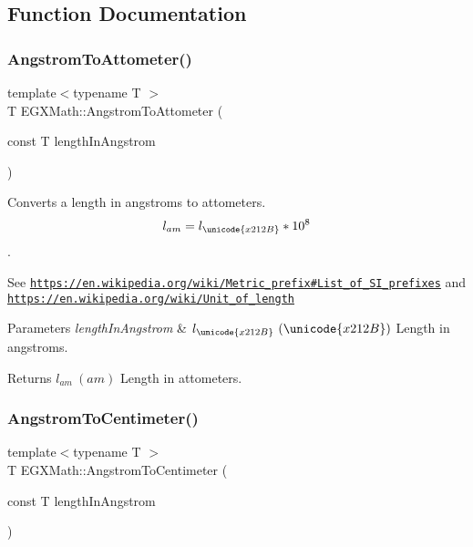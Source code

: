 \subsection{Function Documentation}
\mbox{\label{group___e_g_x_math-_conversions-_length_conversions-_non-_s_i-_angstrom-_s_i_ga9bb7edf645cb82492a8792132dbb74e6}} 
\subsubsection{\texorpdfstring{Angstrom\+To\+Attometer()}{AngstromToAttometer()}}
{\footnotesize\ttfamily template$<$typename T $>$ \\
T E\+G\+X\+Math\+::\+Angstrom\+To\+Attometer (\begin{DoxyParamCaption}\item[{const T}]{length\+In\+Angstrom }\end{DoxyParamCaption})}



Converts a length in angstroms to attometers. \[ l_{am}=l_{\unicode{x212B}} * 10^{8} \]. 

See \href{https://en.wikipedia.org/wiki/Metric_prefix#List_of_SI_prefixes}{\tt https\+://en.\+wikipedia.\+org/wiki/\+Metric\+\_\+prefix\#\+List\+\_\+of\+\_\+\+S\+I\+\_\+prefixes} and \href{https://en.wikipedia.org/wiki/Unit_of_length}{\tt https\+://en.\+wikipedia.\+org/wiki/\+Unit\+\_\+of\+\_\+length} 
\begin{DoxyParams}{Parameters}
{\em length\+In\+Angstrom} & $ l_{\unicode{x212B}}\ (\unicode{x212B})$ Length in angstroms. \\
\hline
\end{DoxyParams}
\begin{DoxyReturn}{Returns}
$ l_{am}\ (am)$ Length in attometers. 
\end{DoxyReturn}
\mbox{\label{group___e_g_x_math-_conversions-_length_conversions-_non-_s_i-_angstrom-_s_i_gac4071068c7a0cfddbf572aab3be97f7b}} 
\subsubsection{\texorpdfstring{Angstrom\+To\+Centimeter()}{AngstromToCentimeter()}}
{\footnotesize\ttfamily template$<$typename T $>$ \\
T E\+G\+X\+Math\+::\+Angstrom\+To\+Centimeter (\begin{DoxyParamCaption}\item[{const T}]{length\+In\+Angstrom }\end{DoxyParamCaption})}



